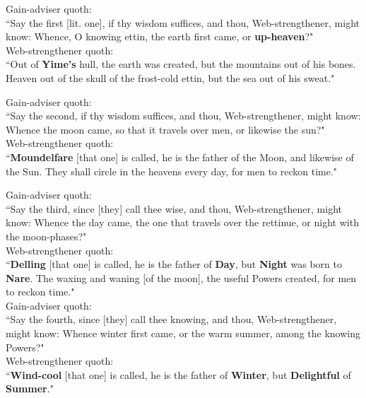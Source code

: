 \bv Gain-adviser quoth: \\ “Say the first [lit. one], if thy wisdom suffices, and thou, Web-strengthener, might know: Whence, O knowing ettin, the earth first came, or \textbf{up-heaven}?" \\

\bv Web-strengthener quoth: \\ “Out of \textbf{Yime's} hull\footnotemark[35], the earth was created, but the mountains out of his bones. Heaven out of the skull of the frost-cold ettin, but the sea out of his sweat.\footnotemark[36]" \\

\bv Gain-adviser quoth: \\ “Say the second, if thy wisdom suffices, and thou, Web-strengthener, might know: Whence the moon came, so that it travels over men, or likewise the sun?" \\

\bv Web-strengthener quoth: \\ “\textbf{Moundelfare} [that one] is called, he is the father of the Moon, and likewise of the Sun. They shall circle in the heavens every day, for men to reckon time\footnotemark[40]." \\

\bv Gain-adviser quoth: \\ “Say the third, since [they] call thee wise, and thou, Web-strengthener, might know: Whence the day came, the one that travels over the rettinue, or night with the moon-phases?" \\

\bv Web-strengthener quoth: \\ “\textbf{Delling} [that one] is called, he is the father of \textbf{Day}, but \textbf{Night} was born to \textbf{Nare}. The waxing and waning [of the moon], the useful Powers created, for men to reckon time." \\

\bv Gain-adviser quoth: \\ “Say the fourth, since [they] call thee knowing, and thou, Web-strengthener, might know: Whence winter first came, or the warm summer, among the knowing Powers?" \\

\bv Web-strengthener quoth: \\ “\textbf{Wind-cool} [that one] is called, he is the father of \textbf{Winter}, but \textbf{Delightful} of \textbf{Summer}." \\

